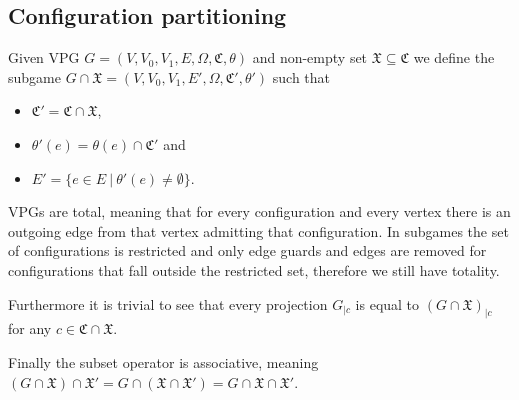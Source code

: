 \subsection{Configuration partitioning}
\begin{definition}
	Given VPG $G = (V,V_0,V_1,E,\Omega,\mathfrak{C},\theta)$ and non-empty set $\mathfrak{X} \subseteq \mathfrak{C}$ we define the subgame $G \cap \mathfrak{X} = (V,V_0,V_1,E',\Omega,\mathfrak{C}', \theta')$ such that
	\begin{itemize}
		\item $\mathfrak{C}' =\mathfrak{C} \cap \mathfrak{X}$,
		\item $\theta'(e) = \theta(e) \cap \mathfrak{C}'$ and
		\item $E' = \{ e \in E\ |\ \theta'(e) \neq \emptyset \}$.
	\end{itemize}
\end{definition}
VPGs are total, meaning that for every configuration and every vertex there is an outgoing edge from that vertex admitting that configuration. In subgames the set of configurations is restricted and only edge guards and edges are removed for configurations that fall outside the restricted set, therefore we still have totality.

Furthermore it is trivial to see that every projection $G_{|c}$ is equal to $(G \cap \mathfrak{X})_{|c}$ for any $c \in \mathfrak{C} \cap \mathfrak{X}$.

Finally the subset operator is associative, meaning $(G \cap \mathfrak{X}) \cap \mathfrak{X}' = G \cap (\mathfrak{X} \cap \mathfrak{X}') = G \cap \mathfrak{X} \cap \mathfrak{X}'$.

